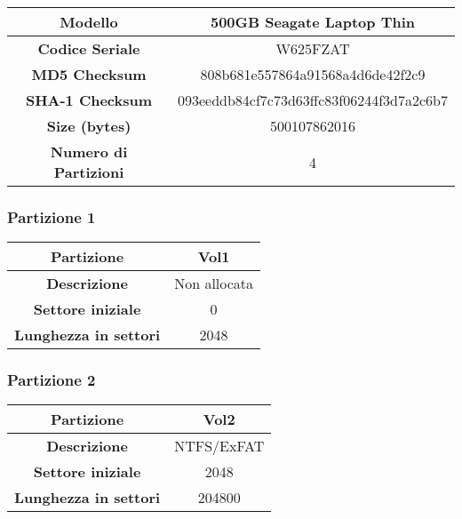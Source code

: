 \begin{center}
    \renewcommand{\arraystretch}{1.5}
    \begin{tabular}{|c|c|}
        \hline
        \textbf{Modello} & 500GB Seagate Laptop Thin \\
        \hline
        \textbf{Codice Seriale} & W625FZAT \\
        \hline
        \textbf{MD5 Checksum} & 808b681e557864a91568a4d6de42f2c9 \\
        \hline
        \textbf{SHA-1 Checksum} & 093eeddb84cf7c73d63ffc83f06244f3d7a2c6b7 \\
        \hline
        \textbf{Size (bytes)} & 500107862016 \\
        \hline
        \textbf{Numero di Partizioni} & 4 \\
        \hline  
    \end{tabular}
\end{center}

\vspace{3pt}
\subsubsection{Partizione 1}
\begin{center}
    \renewcommand{\arraystretch}{1.5}
    \begin{tabular}{|c|c|}
        \hline
        \textbf{Partizione} & Vol1 \\
        \hline
        \textbf{Descrizione} & Non allocata \\
        \hline
        \textbf{Settore iniziale} & 0 \\
        \hline
        \textbf{Lunghezza in settori} & 2048 \\
        \hline
    \end{tabular}
\end{center}

\vspace{3pt}
\subsubsection{Partizione 2}
\begin{center}
    \renewcommand{\arraystretch}{1.5}
    \begin{tabular}{|c|c|}
        \hline
        \textbf{Partizione} & Vol2 \\
        \hline
        \textbf{Descrizione} & NTFS/ExFAT \\
        \hline
        \textbf{Settore iniziale} & 2048 \\
        \hline
        \textbf{Lunghezza in settori} & 204800 \\
        \hline
    \end{tabular}
\end{center}


